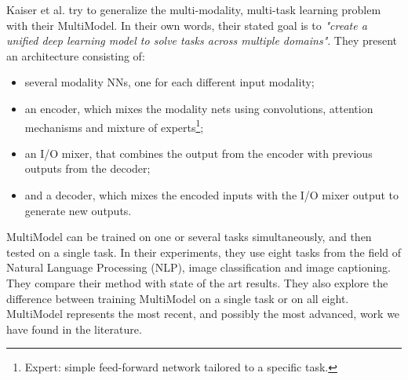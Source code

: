 \documentclass[a4paper]{standalone}
\begin{document}
Kaiser et al. \cite{kaiser2017one} try to generalize the multi-modality, multi-task learning problem with their MultiModel. In their own words, their stated goal is to \emph{"create a unified deep learning model to solve tasks across multiple domains"}. They present an architecture consisting of:
\begin{itemize}
	\item  several modality NNs, one for each different input modality;
	\item an encoder, which mixes the modality nets using convolutions, attention mechanisms and mixture of experts\footnote{Expert: simple feed-forward network tailored to a specific task.};
	\item an I/O mixer, that combines the output from the encoder with previous outputs from the decoder;
	\item and a decoder, which  mixes the encoded inputs with the I/O mixer output to generate new outputs.
\end{itemize}

MultiModel can be trained on one or several tasks simultaneously, and then tested on a single task. In their experiments, they use eight tasks from the field of Natural Language Processing (NLP), image classification and image captioning. They compare their method with state of the art results. They also explore the difference between training MultiModel on a single task or on all eight. MultiModel represents the most recent, and possibly the most advanced, work we have found in the literature.
\end{document}
